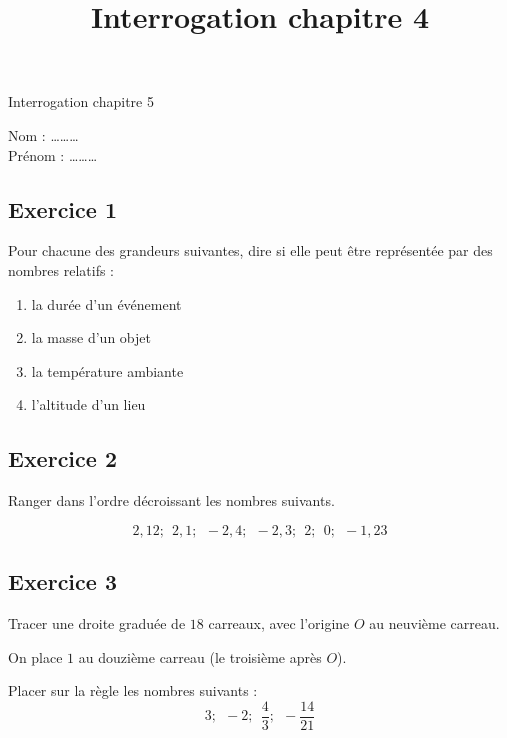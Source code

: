 \documentclass[14 pt]{extarticle}
\title{Interrogation chapitre 4}
\date{}
\theoremstyle{plain}
\begin{document}
\begin{center}{\Large Interrogation chapitre 5}\\ 
 \end{center}
 
 Nom : \ldots\ldots\ldots\\
 Prénom : \ldots\ldots\ldots
 
 
\subsection*{Exercice 1}
 Pour chacune des grandeurs suivantes, dire si elle peut être représentée par des nombres relatifs : 
 
 \begin{enumerate}
 \item la durée d'un événement 
 \item la masse d'un objet
 \item la température ambiante
 \item l'altitude d'un lieu
 \end{enumerate}
\subsection*{Exercice 2}
 
 Ranger dans l'ordre décroissant les nombres suivants. 
 

\[ 2,12 ; \ \ 2,1 ; \ \ -2,4 ; \ \ -2,3 ; \ \ 2 ; \ \ 0 ; \ \ -1,23 \]
 
\subsection*{Exercice 3}
Tracer une droite graduée de $18$ carreaux, avec l'origine $O$ au neuvième carreau. 

On place $1$ au douzième carreau (le troisième après $O$). 

Placer sur la règle les nombres suivants :
\[ 3 ; \ \ -2 ; \ \ \frac43 ; \ \ -\frac{14}{21}\]


\newpage 
\end{document}
